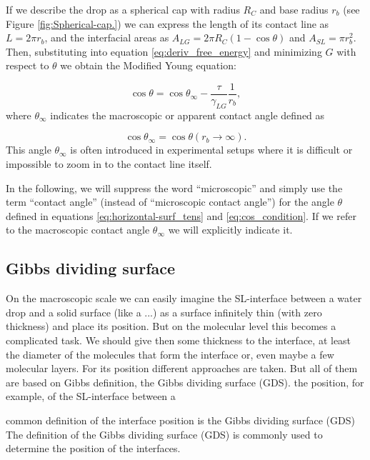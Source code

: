 If we describe the drop as a spherical cap with radius $R_{C}$ and
base radius $r_{b}$ (see Figure \ref{fig:Spherical-cap.}) we can
express the length of its contact line as $L=2\pi r_{b}$, and the
interfacial areas as $A_{LG}=2\pi R_{C}(1-\cos\theta)$ and $A_{SL}=\pi r_{b}^{2}$.
Then, substituting into equation \ref{eq:deriv_free_energy} and minimizing
$G$ with respect to $\theta$ we obtain the Modified Young equation:

\begin{equation}
\cos\theta=\cos\theta_{\infty}-\frac{\tau}{\gamma_{LG}}\frac{1}{r_{b}},\label{eq: young-eq-mod}
\end{equation}
where $\theta_{\infty}$ indicates the macroscopic or apparent contact
angle defined as

\begin{equation}
\cos\theta_{\infty}=\cos\theta(r_{b}\rightarrow\infty).\label{eq:def_apparent_c_angle}
\end{equation}
This angle $\theta_{\infty}$ is often introduced in experimental
setups where it is difficult or impossible to zoom in to the contact
line itself.

In the following, we will suppress the word ``microscopic'' and
simply use the term ``contact angle'' (instead of ``microscopic
contact angle'') for the angle $\theta$ defined in equations \ref{eq:horizontal-surf_tens}
and \ref{eq:cos_condition}. If we refer to the macroscopic contact
angle $\theta_{\infty}$ we will explicitly indicate it.

\subsection{Gibbs dividing surface}

On the macroscopic scale we can easily imagine the SL-interface between
a water drop and a solid surface (like a ...) as a surface infinitely
thin (with zero thickness) and place its position. But on the molecular
level this becomes a complicated task. We should give then some thickness
to the interface, at least the diameter of the molecules that form
the interface or, even maybe a few molecular layers. For its position
different approaches are taken. But all of them are based on Gibbs
definition, the Gibbs dividing surface (GDS). the position, for example,
of the SL-interface between a

common definition of the interface position is the Gibbs dividing
surface (GDS) The definition of the Gibbs dividing surface (GDS) is
commonly used to determine the position of the interfaces.

